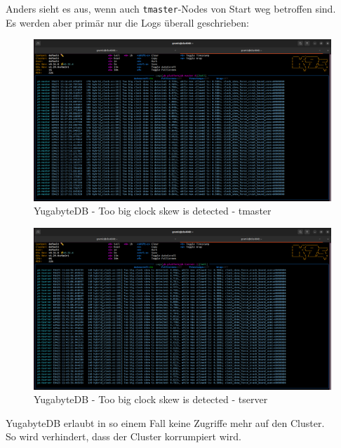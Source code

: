 \begin{flushleft}
    Anders sieht es aus, wenn auch \texttt{tmaster}-Nodes von Start weg betroffen sind.\\
    Es werden aber primär nur die Logs überall geschrieben:
    \begin{figure}[H]
        \centering
        \includegraphics[width=1\linewidth]{source/appendix/evaluation_testing/yugabytedb_yb-tmaster-0_sks1184_clock_error}
        \caption{YugabyteDB - Too big clock skew is detected - tmaster}
        \label{fig:yugabytedb_yb-tmaster-0_sks1184_clock_error}
    \end{figure}
    \begin{figure}[H]
        \centering
        \includegraphics[width=1\linewidth]{source/appendix/evaluation_testing/yugabytedb_yb-tserver-1_sks1184_clock_error}
        \caption{YugabyteDB - Too big clock skew is detected - tserver}
        \label{fig:yugabytedb_yb-tserver-1_sks1184_clock_error}
    \end{figure}
    YugabyteDB erlaubt in so einem Fall keine Zugriffe mehr auf den Cluster.\\
    So wird verhindert, dass der Cluster korrumpiert wird.
\end{flushleft}